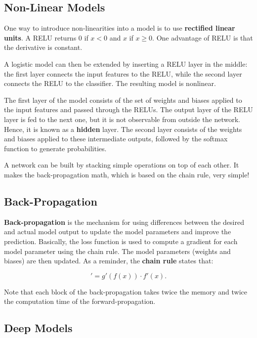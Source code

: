\subsection{Non-Linear Models}

One way to introduce non-linearities into a model is to use \textbf{rectified linear units}. A RELU returns 0 if $x<0$ and $x$ if $x \geq 0$. One advantage of RELU is that the derivative is constant.

A logistic model can then be extended by inserting a RELU layer in the middle: the first layer connects the input features to the RELU, while the second layer connects the RELU to the classifier. The resulting model is nonlinear. 

The first layer of the model consists of the set of weights and biases applied to the input features and passed through the RELUs. The output layer of the RELU layer is fed to the next one, but it is not observable from outside the network. Hence, it is known as a \textbf{hidden} layer. The second layer consists of the weights and biases applied to these intermediate outputs, followed by the softmax function to generate probabilities. 

A network can be built by stacking simple operations on top of each other. It makes the back-propagation math, which is based on the chain rule, very simple! 

\subsection{Back-Propagation}

\textbf{Back-propagation} is the mechanism for using differences between the desired and actual model output to update the model parameters and improve the prediction. Basically, the loss function is used to compute a gradient for each model parameter using the chain rule. The model parameters (weights and biases) are then updated. As a reminder, the \textbf{chain rule} states that:

\begin{equation}
	[g(f(x))]' = g'(f(x)) \cdot f'(x).
\end{equation}

Note that each block of the back-propagation takes twice the memory and twice the computation time of the forward-propagation. 

\subsection{Deep Models}

